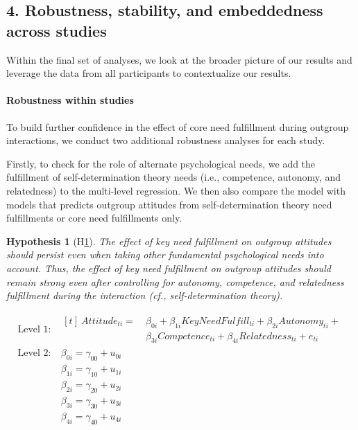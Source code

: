 \documentclass[man, 12pt, a4paper, mask]{apa7}
\theoremstyle{break}
\theoremstyle{plain}
\newtheorem{hyp}{Hypothesis}
\begin{document}
\subsection{4. Robustness, stability, and embeddedness across studies}
Within the final set of analyses, we look at the broader picture of our results and leverage the data from all participants to contextualize our results.  

\paragraph{Robustness within studies}
To build further confidence in the effect of core need fulfillment during outgroup interactions, we conduct two additional robustness analyses for each study.

Firstly, to check for the role of alternate psychological needs, we add the fulfillment of self-determination theory needs (i.e., competence, autonomy, and relatedness) to the multi-level regression. We then also compare the model with models that predicts outgroup attitudes from self-determination theory need fulfillments or core need fulfillments only. 

\begin{mdframed}[style=mdfhypothesis]
    \begin{hyp}[H\ref{hyp:keyNeedSDT}] \label{hyp:keyNeedSDT}
    The effect of key need fulfillment on outgroup attitudes should persist even when taking other fundamental psychological needs into account. Thus, the effect of key need fulfillment on outgroup attitudes should remain strong even after controlling for autonomy, competence, and relatedness fulfillment during the interaction (cf., self-determination theory). 
    \end{hyp}
    
    \begin{fleqn}[\eqskip-\subhypskip]
      \begin{equation} \label{eq:SlopesAttCoreSdt}
        \begin{split}
          \textrm{Level 1:} &
            \begin{aligned}[t]
              \ Attitude_{ti} =  &\ \beta_{0i} + \beta_{1i}KeyNeedFulfill_{ti} + \beta_{2i}Autonomy_{ti} + \\
                                 &\ \beta_{3i}Competence_{ti} + \beta_{4i}Relatedness_{ti} + e_{ti}
            \end{aligned} \\
          \textrm{Level 2:} &\ \beta_{0i} = \gamma_{00} + u_{0i} \\
                            &\ \beta_{1i} = \gamma_{10} + u_{1i} \\
                            &\ \beta_{2i} = \gamma_{20} + u_{2i} \\
                            &\ \beta_{3i} = \gamma_{30} + u_{3i} \\
                            &\ \beta_{4i} = \gamma_{40} + u_{4i}
        \end{split} 
      \end{equation}
    \end{fleqn}
\end{mdframed}
\end{document}
